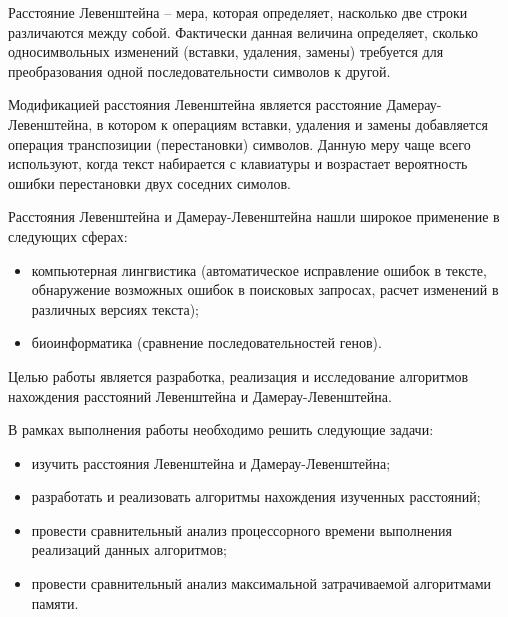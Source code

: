\vspace{\baselineskip}

Расстояние Левенштейна -- мера, которая определяет, насколько две строки различаются между собой. Фактически данная величина определяет, сколько односимвольных изменений (вставки, удаления, замены) требуется для преобразования одной последовательности символов к другой.

Модификацией расстояния Левенштейна является расстояние Дамерау-Левенштейна, в котором к операциям вставки, удаления и замены добавляется операция транспозиции (перестановки) символов. Данную меру чаще всего используют, когда текст набирается с клавиатуры и возрастает вероятность ошибки перестановки двух соседних симолов.

Расстояния Левенштейна и Дамерау-Левенштейна нашли широкое применение в следующих сферах:
\begin{itemize}
    \item компьютерная лингвистика (автоматическое исправление ошибок в тексте, обнаружение возможных ошибок в поисковых запросах, расчет изменений в различных версиях текста);
    \item биоинформатика (сравнение последовательностей генов).
\end{itemize}

Целью работы является разработка, реализация и исследование алгоритмов нахождения расстояний Левенштейна и Дамерау-Левенштейна.

В рамках выполнения работы необходимо решить следующие задачи:

\begin{itemize}
	\item изучить расстояния Левенштейна и Дамерау-Левенштейна;
	\item разработать и реализовать алгоритмы нахождения изученных расстояний;
	\item провести сравнительный анализ процессорного времени выполнения реализаций данных алгоритмов;
	\item провести сравнительный анализ максимальной затрачиваемой алгоритмами памяти.
\end{itemize}